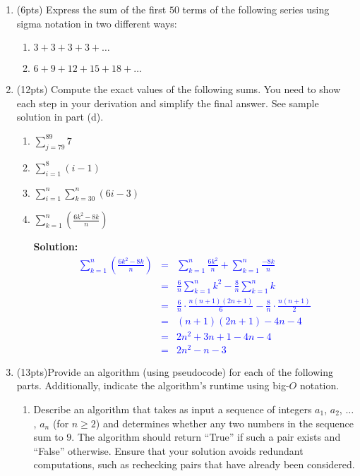 \documentclass{article}
\newcommand{\sol}[1]{\textbf{Solution:\,}\textcolor{blue}{#1}}
\begin{document}
\begin{enumerate}
\item(6pts) Express the sum of the first $50$ terms of the following series using sigma notation in two different ways:
\begin{enumerate}
\item $3 + 3 + 3 + 3 + \ldots$
\item $6 + 9 + 12 + 15 + 18 +\ldots$
\end{enumerate}


 
\item(12pts) Compute the exact values of the following sums. You need to show each step in your derivation and simplify the final answer. See sample solution in part (d). 

\begin{enumerate}

\item $\sum_{j=79}^{89} 7$
\item $\sum_{i=1}^8 (i-1)$
\item $\sum_{i=1}^n\sum_{k=30}^n (6i-3)$
\item $\sum_{k=1}^n (\frac{6k^2 - 8k}{n})$

\sol{
	\begin{eqnarray*}
		\sum_{k=1}^n \left(\frac{6k^2 - 8k}{n}\right) & = &\sum_{k=1}^n \frac{6k^2}{n} + \sum_{k=1}^n \frac{-8k}{n} \\
		& = &\frac{6}{n} \sum_{k=1}^n k^2 - \frac{8}{n} \sum_{k=1}^n k \\
		& = & \frac{6}{n} \cdot \frac{n(n+1)(2n+1)}{6} -\frac{8}{n} \cdot \frac{n(n+1)}{2} \\
		& = & (n+1)(2n+1) - 4n - 4 \\
		& = & 2n^2 + 3n+1 - 4n - 4\\
		& = & 2n^2 - n - 3
	\end{eqnarray*}
}

\end{enumerate}



\item(13pts)Provide an algorithm (using pseudocode) for each of the following parts. Additionally, indicate the algorithm's runtime using big-$O$ notation.
\begin{enumerate}
\item Describe an algorithm that takes as input a sequence of integers $a_1$, $a_2$, $\ldots$, $a_n$ (for $n\geq 2$) and determines whether any two numbers in the sequence sum to $9$. The algorithm should return ``True'' if such a pair exists and ``False'' otherwise. Ensure that your solution avoids redundant computations, such as rechecking pairs that have already been considered.


\end{enumerate}
\end{enumerate}
\end{document}
